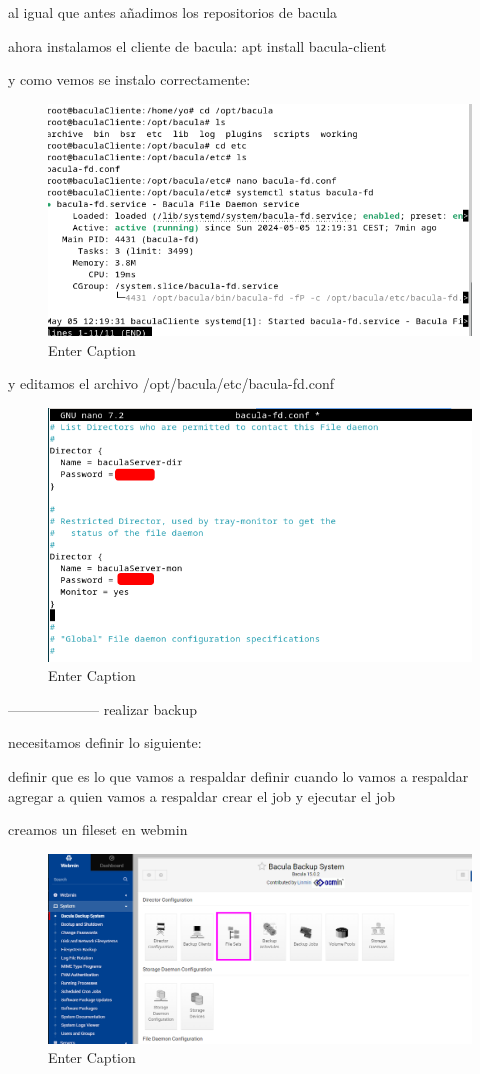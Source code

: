 al igual que antes añadimos los repositorios de bacula


ahora instalamos el cliente de bacula:
apt install bacula-client

y como vemos se instalo correctamente:

\begin{figure}[H]
    \centering
    \includegraphics[width=0.5\linewidth]{instalacionBacula/baculaClienteinstalacion2.png}
    \caption{Enter Caption}
\end{figure}

y editamos el archivo /opt/bacula/etc/bacula-fd.conf

\begin{figure}[H]
    \centering
    \includegraphics[width=0.5\linewidth]{instalacionBacula/baculaFDcongf.png}
    \caption{Enter Caption}
\end{figure}

--------------------
realizar backup

necesitamos definir lo siguiente:

definir que es lo que vamos a respaldar
definir cuando lo vamos a respaldar
agregar a quien  vamos a respaldar
crear el  job 
y ejecutar el job




creamos un fileset en webmin

\begin{figure}[H]
    \centering
    \includegraphics[width=0.5\linewidth]{instalacionBacula/filesetwebmin.png}
    \caption{Enter Caption}
\end{figure}


